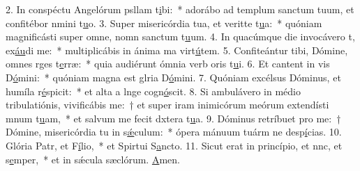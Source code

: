 2. In conspéctu Angelórum psllam t\uline{i}bi:~* adorábo ad templum sanctum tuum, et confitébor nmini t\uline{u}o.
3. Super misericórdia tua, et veritte t\uline{u}a:~* quóniam magnificásti super omne, nomn sanctum t\uline{u}um.
4. In quacúmque die invocávero t, ex\uline{áu}di me:~* multiplicábis in ánima ma virt\uline{ú}tem.
5. Confiteántur tibi, Dómine, omnes rges t\uline{e}rræ:~* quia audiérunt ómnia verb oris t\uline{u}i.
6. Et cantent in vis D\uline{ó}mini:~* quóniam magna est glria D\uline{ó}mini.
7. Quóniam excélsus Dóminus, et humíla r\uline{é}spicit:~* et alta a lnge cogn\uline{ó}scit.
8. Si ambulávero in médio tribulatiónis, vivificábis me:~† et super iram inimicórum meórum extendísti mnum t\uline{u}am,~* et salvum me fecit dxtera t\uline{u}a.
9. Dóminus retríbuet pro me:~† Dómine, misericórdia tu in s\uline{ǽ}culum:~* ópera mánuum tuárm ne desp\uline{í}cias.
10. Glória Patr, et F\uline{í}lio,~* et Spirtui S\uline{a}ncto.
11. Sicut erat in princípio, et nnc, et s\uline{e}mper,~* et in sǽcula sæclórum. \uline{A}men.
